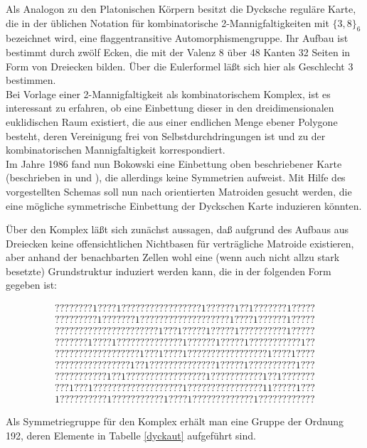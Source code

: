 Als Analogon zu den Platonischen Körpern besitzt die Dycksche reguläre Karte,
die in der üblichen Notation für kombinatorische 2-Mannigfaltigkeiten mit
$\{3,8\}_6$ bezeichnet wird, eine flaggentransitive Automorphismengruppe.
Ihr Aufbau ist bestimmt durch zwölf Ecken, die mit der Valenz 8 über 48 Kanten
32 Seiten in Form von Dreiecken bilden. Über die Eulerformel läßt sich hier
als Geschlecht 3 bestimmen.\\
Bei Vorlage einer 2-Mannigfaltigkeit als kombinatorischem Komplex, ist es
interessant zu erfahren, ob eine Einbettung dieser in den dreidimensionalen
euklidischen Raum existiert, die aus einer endlichen Menge ebener Polygone
besteht, deren Vereinigung frei von Selbstdurchdringungen ist und zu der
kombinatorischen Mannigfaltigkeit korrespondiert.\\
Im Jahre 1986 fand nun Bokowski eine Einbettung oben beschriebener
Karte (beschrieben in \cite{Bo:86} und \cite{HoWi:91}), die allerdings keine
Symmetrien aufweist. Mit Hilfe des vorgestellten Schemas soll nun nach
orientierten Matroiden gesucht werden, die eine mögliche symmetrische
Einbettung der Dyckschen Karte induzieren könnten.

Über den Komplex läßt sich zunächst aussagen, daß aufgrund des Aufbaus
aus Dreiecken keine offensichtlichen Nichtbasen für verträgliche Matroide
existieren, aber anhand der benachbarten Zellen wohl eine (wenn auch nicht
allzu stark besetzte) Grundstruktur induziert werden kann, die in der
folgenden Form gegeben ist:

{\tt $$
\begin{array}{c}
????????1????1?????????????????1??????1??1???????1?????\\
?????????1???????1???????????????????1????1??????1?????\\
??????????????????????1???1?????1?????1??????????1?????\\
???????1????1??????????????1??????1?????1???????????1??\\
??????????????????1???1????1?????????????????1????1????\\
????????????????1??1??????????????1?????1??????????1???\\
???????????1??1?????????????????1???????????1??1???????\\
???1???1???????????????????1????????????????11?????1???\\
1??????????1???????????1????1?????????????1????????????
\end{array}
$$}

Als Symmetriegruppe für den Komplex erhält man eine Gruppe der Ordnung 192,
deren Elemente in Tabelle \ref{dyckaut} aufgeführt sind.

